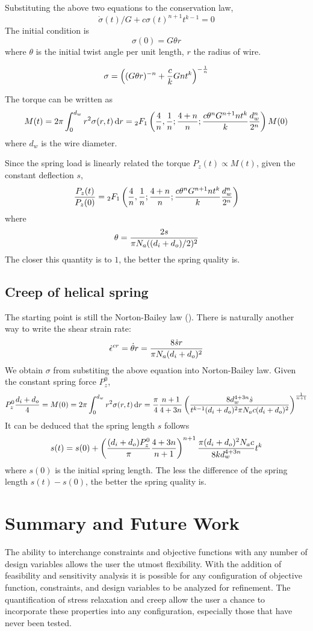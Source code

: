 \documentclass[10pt]{article}
\begin{document}
Substituting the above two equations to the conservation law,
\begin{equation} \label{eq:diff}
\dot{\sigma}(t)/G+c\sigma(t)^{n+1} t^{k-1}=0
\end{equation}
The initial condition is
\[
\sigma (0) = G\theta r
\]
where $\theta$ is the initial twist angle per unit length, $r$ the radius of wire.

\[
\sigma = \left( (G\theta r)^{-n} + {c\over k} Gnt^k \right)^{-{1\over n}}
\]

The torque can be written as
\[
M(t) = 2\pi \int_0^{d_w} r^2 \sigma(r,t)\,\mathrm{d} r ={}_{2}F_1 \left( {4\over n},{1\over n};{4+n\over n};{c\theta^n G^{n+1} n t^k\over k} {d_w^n\over 2^n}\right) M(0)
\]
where $d_w$ is the wire diameter.

Since the spring load is linearly related the torque $P_z(t)\propto M(t)$, given the constant deflection $s$,
\[
{P_z(t)\over P_z(0)} = {}_{2}F_1 \left( {4\over n},{1\over n};{4+n\over n};{c\theta^n G^{n+1} n t^k\over k} {d_w^n\over 2^n}\right)
\]
where
\[
\theta = {2s\over \pi N_a ((d_i+d_o)/2)^2}
\]
The closer this quantity is to $1$, the better the spring quality is.

\subsection{Creep of helical spring}
The starting point is still the Norton-Bailey law (\label{eq:N-B}). There is naturally another way to write the shear strain rate:
\[
\dot{\epsilon}^{cr} = \dot{\theta} r = {8\dot{s} r\over \pi N_a (d_i+d_o)^2}
\]
We obtain $\sigma$ from substiting the above equation into Norton-Bailey law. Given the constant spring force $P_z^0$,
\[
P_z^0{d_i+d_o\over 4}=M(0)=2\pi\int_0^{d_w} r^2 \sigma(r,t)\,\mathrm{d} r
={\pi\over 4}{n+1\over 4+3n}\left( {8d_w^{4+3n}\dot{s} \over t^{k-1} (d_i+d_o)^2 \pi N_a c (d_i+d_o)^2} \right)^{{1\over n+1}}
\]
It can be deduced that the spring length $s$ follows
\[
s(t) = s(0) + \left( {(d_i+d_o)P_z^0\over \pi}{4+3n\over n+1} \right)^{n+1} {\pi (d_i+d_o)^2 N_a c\over 8kd_w^{4+3n}} t^k
\]
where $s(0)$ is the initial spring length. The less the difference of the spring length $s(t)-s(0)$, the better the spring quality is.






\section{Summary and Future Work}
The ability to interchange constraints and objective functions with any number of design variables allows the user the utmost flexibility. With the addition of feasibility and sensitivity analysis it is possible for any configuration of objective function, constraints, and design variables to be analyzed for refinement. The quantification of stress relaxation and creep allow the user a chance to incorporate these properties into any configuration, especially those that have never been tested. 
\end{document}
